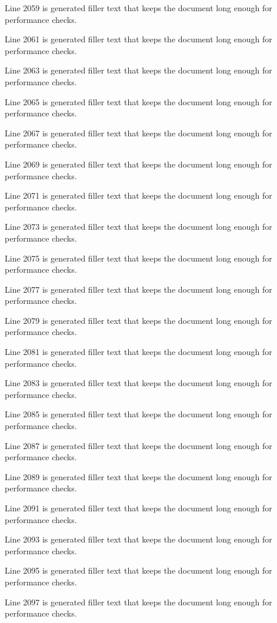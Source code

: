Line 2059 is generated filler text that keeps the document long enough for performance checks.

Line 2061 is generated filler text that keeps the document long enough for performance checks.

Line 2063 is generated filler text that keeps the document long enough for performance checks.

Line 2065 is generated filler text that keeps the document long enough for performance checks.

Line 2067 is generated filler text that keeps the document long enough for performance checks.

Line 2069 is generated filler text that keeps the document long enough for performance checks.

Line 2071 is generated filler text that keeps the document long enough for performance checks.

Line 2073 is generated filler text that keeps the document long enough for performance checks.

Line 2075 is generated filler text that keeps the document long enough for performance checks.

Line 2077 is generated filler text that keeps the document long enough for performance checks.

Line 2079 is generated filler text that keeps the document long enough for performance checks.

Line 2081 is generated filler text that keeps the document long enough for performance checks.

Line 2083 is generated filler text that keeps the document long enough for performance checks.

Line 2085 is generated filler text that keeps the document long enough for performance checks.

Line 2087 is generated filler text that keeps the document long enough for performance checks.

Line 2089 is generated filler text that keeps the document long enough for performance checks.

Line 2091 is generated filler text that keeps the document long enough for performance checks.

Line 2093 is generated filler text that keeps the document long enough for performance checks.

Line 2095 is generated filler text that keeps the document long enough for performance checks.

Line 2097 is generated filler text that keeps the document long enough for performance checks.


